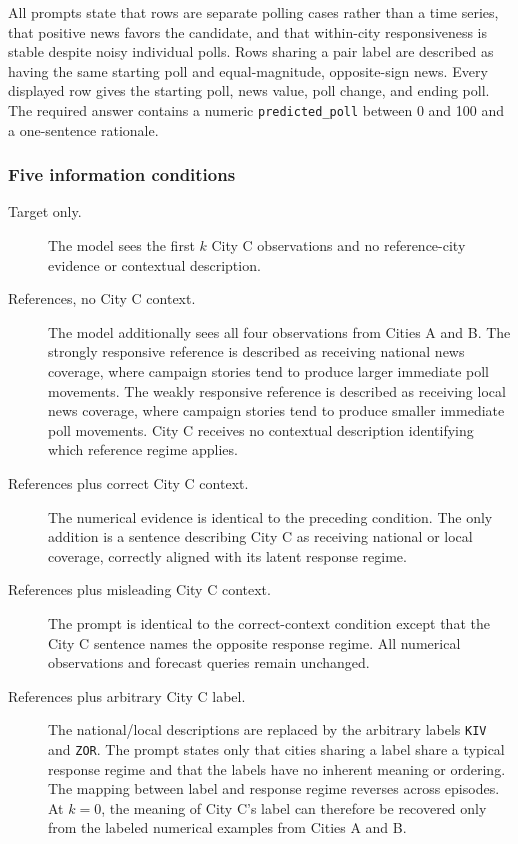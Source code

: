 All prompts state that rows are separate polling cases rather than a time series, that positive news favors the candidate, and that within-city responsiveness is stable despite noisy individual polls.
Rows sharing a pair label are described as having the same starting poll and equal-magnitude, opposite-sign news.
Every displayed row gives the starting poll, news value, poll change, and ending poll.
The required answer contains a numeric \texttt{predicted\_poll} between 0 and 100 and a one-sentence rationale.

\subsubsection{Five information conditions}

\begin{description}

\item[Target only.]
The model sees the first \(k\) City C observations and no reference-city evidence or contextual description.

\item[References, no City C context.]
The model additionally sees all four observations from Cities A and B.
The strongly responsive reference is described as receiving national news coverage, where campaign stories tend to produce larger immediate poll movements.
The weakly responsive reference is described as receiving local news coverage, where campaign stories tend to produce smaller immediate poll movements.
City C receives no contextual description identifying which reference regime applies.

\item[References plus correct City C context.]
The numerical evidence is identical to the preceding condition.
The only addition is a sentence describing City C as receiving national or local coverage, correctly aligned with its latent response regime.

\item[References plus misleading City C context.]
The prompt is identical to the correct-context condition except that the City C sentence names the opposite response regime.
All numerical observations and forecast queries remain unchanged.

\item[References plus arbitrary City C label.]
The national/local descriptions are replaced by the arbitrary labels \texttt{KIV} and \texttt{ZOR}.
The prompt states only that cities sharing a label share a typical response regime and that the labels have no inherent meaning or ordering.
The mapping between label and response regime reverses across episodes.
At \(k=0\), the meaning of City C's label can therefore be recovered only from the labeled numerical examples from Cities A and B.

\end{description}

